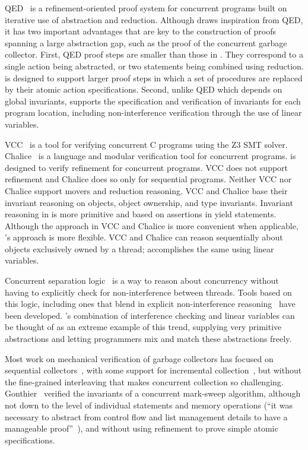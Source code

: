 QED~\cite{ElmasQT09} is a refinement-oriented proof system for concurrent programs built on iterative use of abstraction and reduction.
Although \civl draws inspiration from QED, it has two important advantages that are key to 
the construction of proofs spanning a large abstraction gap, such as the proof of the concurrent garbage collector.
First, QED proof steps are smaller than those in \civl. 
They correspond to a single action being abstracted, or two statements being combined using reduction. 
\civl is designed to support larger proof steps in which a set of procedures are replaced by their atomic action specifications. 
Second, unlike QED which depends on global invariants, 
\civl supports the specification and verification of invariants for each program location, 
including non-interference verification through the use of linear variables. 

VCC~\cite{VCC} is a tool for verifying concurrent C programs using the Z3 SMT solver.  
Chalice~\cite{LM09} is a language and modular verification tool for concurrent programs. 
\civl is designed to verify refinement for concurrent programs.  
VCC does not support refinement and Chalice does so only for sequential programs. 
Neither VCC nor Chalice support movers and reduction reasoning.
VCC and Chalice base their invariant reasoning on objects, object ownership, and type invariants. 
Invariant reasoning in \civl is more primitive and based on assertions in yield statements. 
Although the approach in VCC and Chalice is more convenient when applicable, \civl's approach is more flexible. 
VCC and Chalice can reason sequentially about objects exclusively owned by a thread;
\civl accomplishes the same using linear variables.

Concurrent separation logic~\cite{OHearn07} is a way to reason about concurrency without having to 
explicitly check for non-interference between threads. 
Tools based on this logic, including ones that blend in explicit non-interference reasoning~\cite{SAGL,RGSep} have been developed. 
\civl's combination of interference checking and linear variables can be thought of as an extreme example of this trend, 
supplying very primitive abstractions and letting programmers mix and match these abstractions freely.

Most work on mechanical verification of garbage collectors has focused on sequential collectors~\cite{mccr07,hawb09},
with some support for incremental collection~\cite{mccr07},
but without the fine-grained interleaving that makes concurrent collection so challenging.
Gonthier~\cite{gont96} verified the invariants of a concurrent mark-sweep algorithm,
although not down to the level of individual statements and memory operations
(``it was necessary to abstract from control flow and list management details to have a manageable proof''~\cite{gont96}),
and without using refinement to prove simple atomic specifications.

